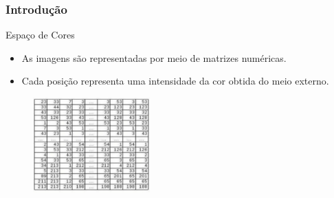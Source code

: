 \documentclass{beamer}
\begin{document}
\begin{frame}
\frametitle{Introdução}

		\begin{block}{Espaço de Cores}
			\begin{itemize}
				\item As imagens são representadas por meio de matrizes numéricas.
				
				\item Cada posição representa uma intensidade da cor obtida do meio externo.
			\end{itemize} 
		\end{block}
		
		\begin{figure}[!h]
			\begin{center}
				\includegraphics[width=0.4\textwidth]{Figures/table}
			\end{center}
		\end{figure}
	
\end{frame}
\end{document}

